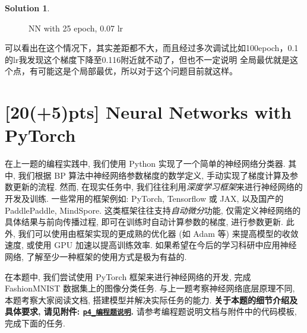 \documentclass[a4paper,UTF8]{article}
\numberwithin{equation}{section}
\theoremstyle{definition}
\newtheorem*{solution}{Solution}
\begin{document}
\begin{solution}
\begin{figure}[H]
    \caption{NN with 25 epoch, 0.07 lr}
    \label{fig:NN with 25 epoch, 0.07 lr}
\end{figure} 
可以看出在这个情况下，其实差距都不大，而且经过多次调试比如100epoch，0.1的lr我发现这个梯度下降至0.116附近就不动了，但也不一定说明
全局最优就是这个点，有可能这是个局部最优，所以对于这个问题目前就这样。


\end{solution}

\newpage

\section{[20(+5)pts] Neural Networks with PyTorch}

\begin{tcolorbox}
在上一题的编程实践中, 我们使用 Python 实现了一个简单的神经网络分类器. 其中, 我们根据 BP 算法中神经网络参数梯度的数学定义, 手动实现了梯度计算及参数更新的流程. 然而, 在现实任务中, 我们往往利用\textit{深度学习框架}来进行神经网络的开发及训练. 一些常用的框架例如: PyTorch, Tensorflow 或 JAX, 以及国产的 PaddlePaddle, MindSpore. 这类框架往往支持\textit{自动微分}功能, 仅需定义神经网络的具体结果与前向传播过程, 即可在训练时自动计算参数的梯度, 进行参数更新. 此外, 我们可以使用由框架实现的更成熟的优化器 (如 Adam 等) 来提高模型的收敛速度, 或使用 GPU 加速以提高训练效率. 如果希望在今后的学习科研中应用神经网络, 了解至少一种框架的使用方式是极为有益的.
\end{tcolorbox}

在本题中, 我们尝试使用 PyTorch 框架来进行神经网络的开发, 完成 FashionMNIST 数据集上的图像分类任务. 与上一题考察神经网络底层原理不同, 本题考察大家阅读文档, 搭建模型并解决实际任务的能力. \textbf{关于本题的细节介绍及具体要求, 请见附件: \href{https://www.lamda.nju.edu.cn/ML2024Spring/homework/HW3/p4_guide.pdf}{\texttt{p4\hspace{0em}\_\hspace{0em}编程题说明}}.} 请参考编程题说明文档与附件中的代码模板, 完成下面的任务.
\end{document}
